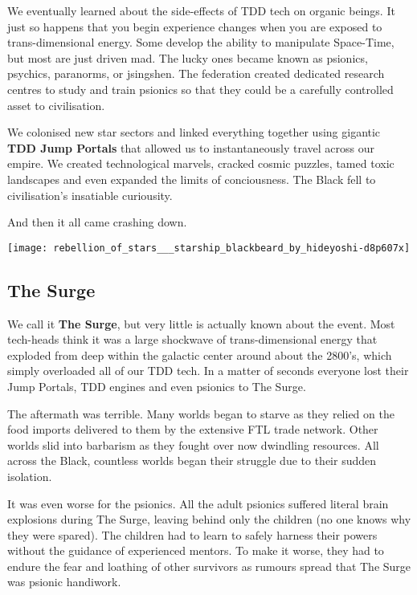 \begin{multicols}{2}
  We eventually learned about the side-effects of TDD tech on organic beings. It just so happens that you begin experience changes when you are exposed to trans-dimensional energy. Some develop the ability to manipulate Space-Time, but most are just driven mad. The lucky ones became known as psionics, psychics, paranorms, or jsingshen. The federation created dedicated research centres to study and train psionics so that they could be a carefully controlled asset to civilisation.
  
  We colonised new star sectors and linked everything together using gigantic \textbf{TDD Jump Portals} that allowed us to instantaneously travel across our empire. We created technological marvels, cracked cosmic puzzles, tamed toxic landscapes and even expanded the limits of conciousness. The Black fell to civilisation's insatiable curiousity.

  And then it all came crashing down.
  
  \vspace{\baselineskip}

  \texttt{[image: rebellion\_of\_stars\_\_\_starship\_blackbeard\_by\_hideyoshi-d8p607x]}
  
  \subsection{The Surge}

  We call it \textbf{The Surge}, but very little is actually known about the event. Most tech-heads think it was a large shockwave of trans-dimensional energy that exploded from deep within the galactic center around about the 2800's, which simply overloaded all of our TDD tech. In a matter of seconds everyone lost their Jump Portals, TDD engines and even psionics to The Surge.

  The aftermath was terrible. Many worlds began to starve as they relied on the food imports delivered to them by the extensive FTL trade network. Other worlds slid into barbarism as they fought over now dwindling resources. All across the Black, countless worlds began their struggle due to their sudden isolation.
  
  It was even worse for the psionics. All the adult psionics suffered literal brain explosions during The Surge, leaving behind only the children (no one knows why they were spared). The children had to learn to safely harness their powers without the guidance of experienced mentors. To make it worse, they had to endure the fear and loathing of other survivors as rumours spread that The Surge was psionic handiwork.
  

\end{multicols}
